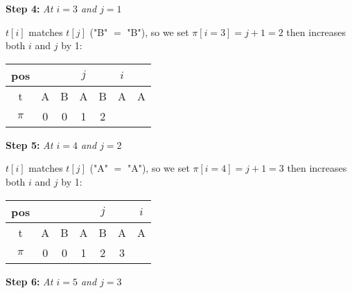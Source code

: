     \textbf{Step 4: }\textit{At $i = 3$ and $j = 1$}
    
    $t[i]$ matches $t[j]$ ("B" $=$ "B"), so we set $\pi[i = 3] = j + 1 = 2$ then increases both $i$ and $j$ by 1:
    \begin{table}[H]
    \centering
    \begin{tabular}{|c|c|c|c|c|c|c|}
    \hline
    pos   &   &   & $j$ &   & $i$ &   \\ \hline
    t     & A & B & A & B & A & A \\ \hline
    $\pi$ & 0 & 0 & 1 & 2 &   &   \\ \hline
    \end{tabular}
    \end{table}
    \textbf{Step 5: }\textit{At $i = 4$ and $j = 2$}
    
    $t[i]$ matches $t[j]$ ("A" $=$ "A"), so we set $\pi[i = 4] = j + 1 = 3$ then increases both $i$ and $j$ by 1:
    \begin{table}[H]
    \centering
    \begin{tabular}{|c|c|c|c|c|c|c|}
    \hline
    pos   &   &   &   & $j$ &   & $i$ \\ \hline
    t     & A & B & A & B & A & A \\ \hline
    $\pi$ & 0 & 0 & 1 & 2 & 3 &   \\ \hline
    \end{tabular}
    \end{table}
    \textbf{Step 6: }\textit{At $i = 5$ and $j = 3$} 
    
